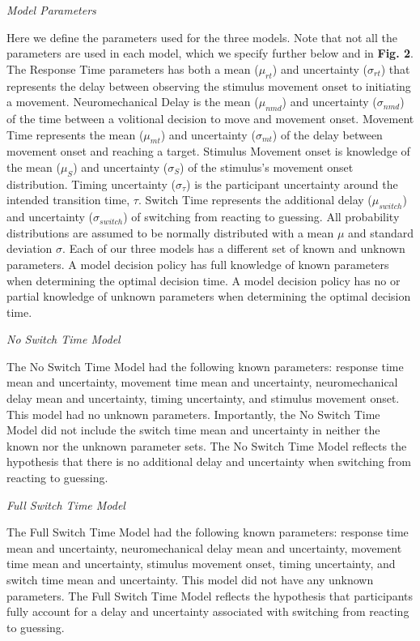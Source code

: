 \documentclass[12pt]{article}
\newcommand\boldblue[1]{\textcolor{mydarkblue}{\textbf{#1}}}
\begin{document}
\vspace{2mm}
\noindent \emph{Model Parameters}

\noindent Here we define the parameters used for the three models. Note that not all the parameters are used in each model, which we specify further below and in \boldblue{Fig. 2}. The Response Time parameters has both a mean ($\mu_{rt}$) and uncertainty ($\sigma_{rt}$) that represents the delay between observing the stimulus movement onset to initiating a movement. Neuromechanical Delay is the mean ($\mu_{nmd}$) and uncertainty ($\sigma_{nmd}$) of the time between a volitional decision to move and movement onset. Movement Time represents the mean ($\mu_{mt}$) and uncertainty ($\sigma_{mt}$) of the delay between movement onset and reaching a target. Stimulus Movement onset is knowledge of the mean ($\mu_{S}$) and uncertainty ($\sigma_{S}$) of the stimulus’s movement onset distribution. Timing uncertainty ($\sigma_{\tau}$) is the participant uncertainty around the intended transition time, $\tau$. Switch Time represents the additional delay ($\mu_{switch}$) and uncertainty  ($\sigma_{switch}$) of switching from reacting to guessing. All probability distributions are assumed to be normally distributed with a mean $\mu$ and standard deviation $\sigma$.  Each of our three models has a different set of known and unknown parameters. A model decision policy has full knowledge of known parameters when determining the optimal decision time. A model decision policy has no or partial knowledge of unknown parameters when determining the optimal decision time.

\vspace{2mm}
\noindent \emph{No Switch Time Model}

\noindent The No Switch Time Model had the following known parameters: response time mean and uncertainty, movement time mean and uncertainty, neuromechanical delay mean and uncertainty, timing uncertainty, and stimulus movement onset. This model had no unknown parameters. Importantly, the No Switch Time Model did not include the switch time mean and uncertainty in neither the known nor the unknown parameter sets. The No Switch Time Model reflects the hypothesis that there is no additional delay and uncertainty when switching from reacting to guessing.

\vspace*{2mm}
\noindent \emph{Full Switch Time Model}

\noindent The Full Switch Time Model had the following known parameters: response time mean and uncertainty, neuromechanical delay mean and uncertainty, movement time mean and uncertainty, stimulus movement onset, timing uncertainty, and switch time mean and uncertainty. This model did not have any unknown parameters. The Full Switch Time Model reflects the hypothesis that participants fully account for a delay and uncertainty associated with switching from reacting to guessing.
\end{document}
